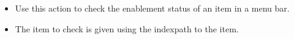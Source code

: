 \begin{itemize}
\item Use this action to check the enablement status of an item in a menu bar.
\item The item to check is given using the indexpath to the item.
\end{itemize}
